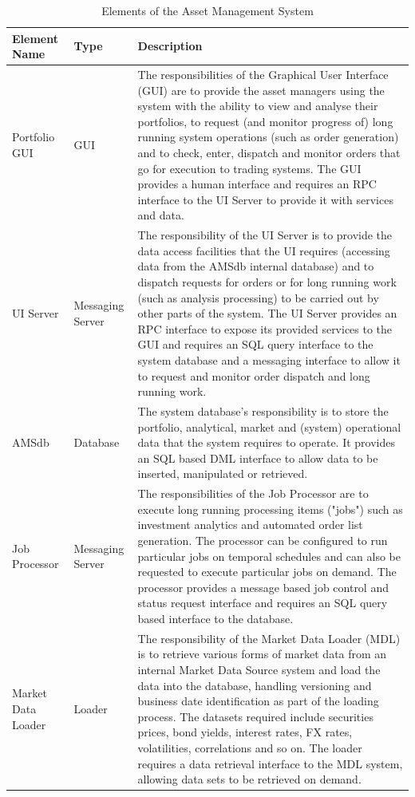 \begin{table}
\caption{Elements of the Asset Management System}
\label{table:amselements}
\footnotesize
\begin{tabular}{l l p{7cm}}
Element Name & Type & Description \\
\hline

Portfolio GUI      & GUI              & The responsibilities of the Graphical User Interface (GUI) are to provide the asset managers using the system with the ability to view and analyse their portfolios, to request (and monitor progress of) long running system operations (such as order generation) and to check, enter, dispatch and monitor orders that go for execution to trading systems.  The GUI provides a human interface and requires an RPC interface to the UI Server to provide it with services and data. \\

UI Server          & Messaging Server & The responsibility of the UI Server is to provide the data access facilities that the UI requires (accessing data from the AMSdb internal database) and to dispatch requests for orders or for long running work (such as analysis processing) to be carried out by other parts of the system.  The UI Server provides an RPC interface to expose its provided services to the GUI and requires an SQL query interface to the system database and a messaging interface to allow it to request and monitor order dispatch and long running work. \\

AMSdb              & Database         & The system database's responsibility is to store the portfolio, analytical, market and (system) operational data that the system requires to operate.  It provides an SQL based DML interface to allow data to be inserted, manipulated or retrieved. \\

Job Processor      & Messaging Server & The responsibilities of the Job Processor are to execute long running processing items ("jobs") such as investment analytics and automated order list generation.  The processor can be configured to run particular jobs on temporal schedules and can also be requested to execute particular jobs on demand.  The processor provides a message based job control and status request interface and requires an SQL query based interface to the database. \\

Market Data Loader & Loader           & The responsibility of the Market Data Loader (MDL) is to retrieve various forms of market data from an internal Market Data Source system and load the data into the database, handling versioning and business date identification as part of the loading process.  The datasets required include securities prices, bond yields, interest rates, FX rates, volatilities, correlations and so on.  The loader requires a data retrieval interface to the MDL system, allowing data sets to be retrieved on demand. \\


\end{tabular}
\end{table}
